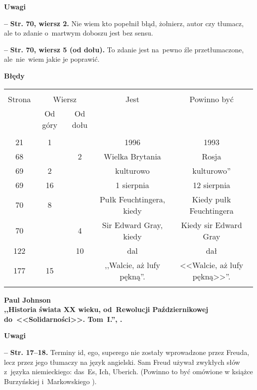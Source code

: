 \documentclass[a4paper,11pt]{article}
\newcommand{\spaceOne}{2em}
\newcommand{\tb}{\textbf}
\newcommand{\noi}{\noindent}
\newcommand{\start}{\noi \tb{--} {}}
\newcommand{\Center}[1]{\begin{center} #1 \end{center}}
\newcommand{\CenterTB}[1]{\Center{\tb{#1}}}
\newcommand{\Str}[1]{\tb{Str. #1.}}
\newcommand{\StrWg}[2]{\tb{Str. #1, wiersz #2.}}
\newcommand{\StrWd}[2]{\tb{Str. #1, wiersz #2 (od dołu).}}
\newcommand{\Work}[1]{ \begin{center} {\large \tb{#1}} \end{center} }
\begin{document}
\CenterTB{Uwagi}

\start \StrWg{70}{2} Nie wiem kto popełnił błąd, żołnierz, autor czy
tłumacz, ale to zdanie o~martwym doboszu jest bez sensu.

\start \StrWd{70}{5} To zdanie jest na~pewno źle przetłumaczone,
ale~nie~wiem jakie je poprawić.

\CenterTB{Błędy}
\begin{center}
  \begin{tabular}{|c|c|c|c|c|}
    \hline
    & \multicolumn{2}{c|}{} & & \\
    Strona & \multicolumn{2}{c|}{Wiersz}& Jest & Powinno być \\ \cline{2-3}
    & Od góry & Od dołu &  &  \\ \hline
    & & & & \\
    21 & 1 & & 1996 & 1993 \\
    68 & & 2 & Wielka Brytania & Rosja \\
    69 & 2 & & kulturowo & kulturowo'' \\
    69 & 16 & & 1 sierpnia & 12 sierpnia \\
    70 & 8 & & Pułk Feuchtingera, kiedy & Kiedy pułk Feuchtingera \\
    70 & & 4 & Sir Edward Gray, kiedy & Kiedy sir Edward Gray \\
    122 & & 10 & dal & dał \\
    177 & 15 & & ,,Walcie, aż lufy pękną''.
           & <<Walcie, aż lufy pękną>>''. \\
    & & & & \\ \hline
  \end{tabular}
\end{center}

\vspace{\spaceOne}






\Work{
  Paul Johnson \\
  ,,Historia świata XX wieku, od~Rewolucji Październikowej \\
  do~<<Solidarności>>. Tom~I.'', \cite{Joh09a}.}


\CenterTB{Uwagi}

\start \Str{17--18} Terminy id, ego, superego nie zostały wprowadzone
przez Freuda, lecz przez jego tłumaczy na język angielski. Sam Freud
używał zwykłych słów z~języka niemieckiego: das~Es, Ich, Uberich.
(Powinno to być omówione w książce Burzyńskiej i~Markowskiego
\cite{BM09}).
\end{document}
